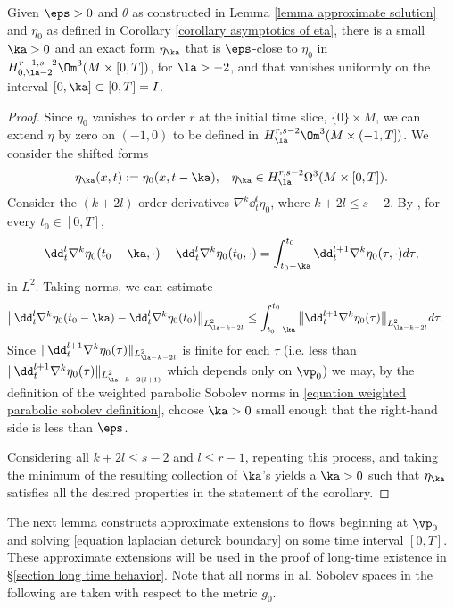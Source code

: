\documentclass[hidelinks, 12pt, oneside, reqno]{amsart}
\begin{document}
\begin{cor}\label{corollary nearby vanishing short time}
    Given $\eps >0$ and $\theta$ as constructed in Lemma \ref{lemma approximate solution} and $\eta_0$ as defined in Corollary \ref{corollary asymptotics of eta}, there is a small $\ka > 0$ and an exact form $\eta_\ka$ that is $\eps$-close to $\eta_0$ in $H^{r-1,s-2}_{0,\la-2}\Om^3(M \times [0,T])$, for $\la > -2$, and that vanishes uniformly on the interval $[0,\ka] \subset [0,T] = I$.
\end{cor}

\begin{proof}
    Since $\eta_0$ vanishes to order $r$ at the initial time slice, $\{0\} \times M$, we can extend $\eta$ by zero on $(-1,0)$ to be defined in $H^{r,s-2}_\la \Om^3(M \times (-1,T])$. We consider the shifted forms 
    \begin{align*}
        \eta_{\ka}(x,t) := \eta_0(x, t-\ka),\;\;\; \eta_{\ka} \in H^{r,s-2}_\la \Omega^3 (M \times [0,T]).
    \end{align*}
    Consider the $(k+2l)$-order derivatives $\nabla^k\dd_t^l \eta_0$, where $k + 2l \le s-2$. By \cite[Theorem 2, \S 5.9.2]{EvansPDE}, for every $t_0 \in [0,T]$,
    \[
    \dd_t^l \nabla^k \eta_0(t_0 - \ka, \cdot) - \dd_t^l \nabla^k \eta_0(t_0, \cdot) = \int_{t_0 - \ka}^{t_0}  \dd_t^{l+1} \nabla^k \eta_0(\tau, \cdot) d\tau,
    \]
    in $L^2$. Taking norms, we can estimate
    \begin{align*}
        \big\| \dd_t^l \nabla^k \eta_0(t_0 - \ka) - \dd_t^l \nabla^k \eta_0(t_0)\big\|_{L^2_{\la-k-2l}} &\le \int_{t_0 - \ka}^{t_0} \big \| \dd_t^{l+1} \nabla^k \eta_0(\tau)\big\|_{L^2_{\la -k -2l}} d\tau.
    \end{align*}
    Since $\|\dd_t^{l+1} \nabla^k \eta_0(\tau)\|_{L^2_{\la-k-2l}}$ is finite for each $\tau$ (i.e. less than $\|\dd_t^{l+1} \nabla^k \eta_0(\tau)\|_{L^2_{\la-k-2(l+1)}}$ which depends only on $\vp_0$) we may, by the definition of the weighted parabolic Sobolev norms in \eqref{equation weighted parabolic sobolev definition}, choose $\ka >0$ small enough that the right-hand side is less than $\eps$.

    Considering all $k + 2l \le s-2$ and $l \le r-1$, repeating this process, and taking the minimum of the resulting collection of $\ka$'s yields a $\ka > 0$ such that $\eta_\ka$ satisfies all the desired properties in the statement of the corollary.
\end{proof}

The next lemma constructs approximate extensions to flows beginning at $\vp_0$ and solving \eqref{equation laplacian deturck boundary} on some time interval $[0,T]$. These approximate extensions will be used in the proof of long-time existence in \S \ref{section long time behavior}. Note that all norms in all Sobolev spaces in the following are taken with respect to the metric $g_0$.
\end{document}
